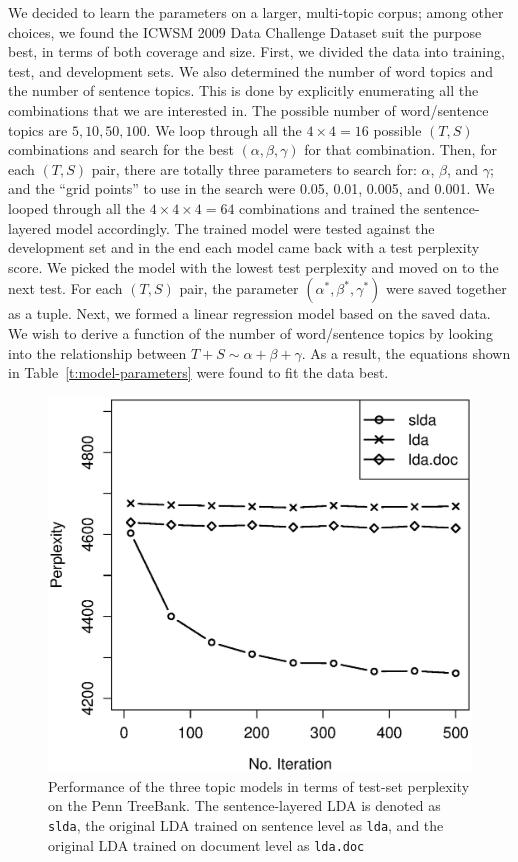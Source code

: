 We decided to learn the parameters on a larger, multi-topic corpus; among other
choices, we found the ICWSM 2009 Data Challenge Dataset \cite{burton2009icwsm}
suit the purpose best, in terms of both coverage and size.  First, we divided the
data into training, test, and development sets.  We also determined the number
of word topics and the number of sentence topics.  This is done by explicitly
enumerating all the combinations that we are interested in.  The possible
number of word/sentence topics are ${5, 10, 50, 100}$.   We loop through all
the $4 \times 4 = 16$ possible $(T,S)$ combinations and search for the best
$(\alpha, \beta, \gamma)$ for that combination.  Then, for each $(T, S)$ pair,
there are totally three parameters to search for: $\alpha$, $\beta$, and
$\gamma$; and the ``grid points'' to use in the search were 0.05, 0.01, 0.005,
and 0.001.  We looped through all the $4 \times 4 \times 4 = 64$ combinations
and trained the sentence-layered model accordingly.  The trained model were
tested against the development set and in the end each model came back with a
test perplexity score.  We picked the model with the lowest test perplexity and
moved on to the next test.  For each $(T, S)$ pair, the parameter $(\alpha^*,
\beta^*, \gamma^*)$ were saved together as a tuple.  Next, we formed a linear
regression model based on the saved data.  We wish to derive a function of the
number of word/sentence topics by looking into the relationship between $T + S
\sim \alpha + \beta + \gamma$.  As a result, the equations shown in
Table~\ref{t:model-parameters} were found to fit the data best.

\begin{figure}[!ht]
  \centering
  \includegraphics[width=\columnwidth]{ppl.eps}
  \caption{Performance of the three topic models in terms of test-set
  perplexity on the Penn TreeBank.  The sentence-layered LDA is denoted as {\tt
  slda}, the original LDA trained on sentence level as {\tt lda}, and the
  original LDA trained on document level as {\tt lda.doc} }
  \label{f:perplexity}
\end{figure}

